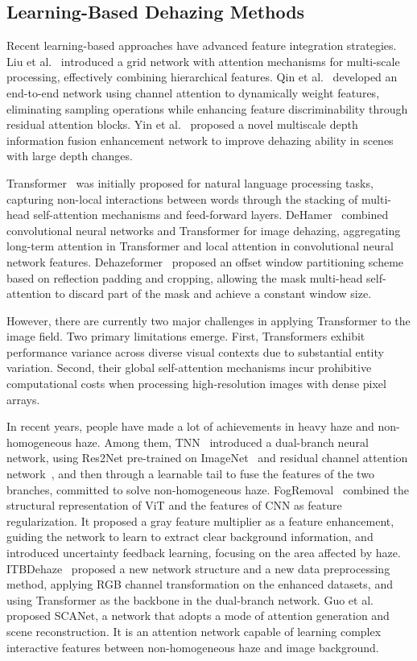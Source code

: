 \documentclass[journal]{IEEEtran}
\begin{document}
\subsection{Learning-Based Dehazing Methods}
Recent learning-based approaches have advanced feature integration strategies. Liu et al.~\cite{liu2019griddehazenet} introduced a grid network with attention mechanisms for multi-scale processing, effectively combining hierarchical features. Qin et al.~\cite{qin2020ffa} developed an end-to-end network using channel attention to dynamically weight features, eliminating sampling operations while enhancing feature discriminability through residual attention blocks. Yin et al.~\cite{yin2023multiscale} proposed a novel multiscale depth information fusion enhancement network to improve dehazing ability in scenes with large depth changes.

Transformer~\cite{vaswani2017attention} was initially proposed for natural language processing tasks, capturing non-local interactions between words through the stacking of multi-head self-attention mechanisms and feed-forward layers. DeHamer~\cite{guo2022image} combined convolutional neural networks and Transformer for image dehazing, aggregating long-term attention in Transformer and local attention in convolutional neural network features. Dehazeformer~\cite{song2023vision} proposed an offset window partitioning scheme based on reflection padding and cropping, allowing the mask multi-head self-attention to discard part of the mask and achieve a constant window size.

However, there are currently two major challenges in applying Transformer to the image field. Two primary limitations emerge. First, Transformers exhibit performance variance across diverse visual contexts due to substantial entity variation. Second, their global self-attention mechanisms incur prohibitive computational costs when processing high-resolution images with dense pixel arrays.

In recent years, people have made a lot of achievements in heavy haze and non-homogeneous haze. Among them, TNN~\cite{yu2021two} introduced a dual-branch neural network, using Res2Net pre-trained on ImageNet~\cite{deng2009imagenet} and residual channel attention network~\cite{zhang2018image}, and then through a learnable tail to fuse the features of the two branches, committed to solve non-homogeneous haze. FogRemoval~\cite{jin2022structure} combined the structural representation of ViT\cite{dosovitskiy2020image} and the features of CNN as feature regularization. It proposed a gray feature multiplier as a feature enhancement, guiding the network to learn to extract clear background information, and introduced uncertainty feedback learning, focusing on the area affected by haze. ITBDehaze~\cite{liu2023data} proposed a new network structure and a new data preprocessing method, applying RGB channel transformation on the enhanced datasets, and using Transformer as the backbone in the dual-branch network. Guo et al.~\cite{guo2023scanet} proposed SCANet, a network that adopts a mode of attention generation and scene reconstruction. It is an attention network capable of learning complex interactive features between non-homogeneous haze and image background.
\end{document}
